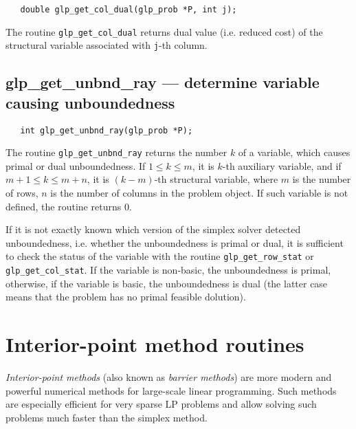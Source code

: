 \synopsis

\begin{verbatim}
   double glp_get_col_dual(glp_prob *P, int j);
\end{verbatim}

\returns

The routine \verb|glp_get_col_dual| returns dual value (i.e. reduced
cost) of the structural variable associated with \verb|j|-th column.

\newpage

\subsection{glp\_get\_unbnd\_ray --- determine variable causing
unboundedness}

\synopsis

\begin{verbatim}
   int glp_get_unbnd_ray(glp_prob *P);
\end{verbatim}

\returns

The routine \verb|glp_get_unbnd_ray| returns the number $k$ of
a variable, which causes primal or dual unboundedness.
If $1\leq k\leq m$, it is $k$-th auxiliary variable, and if
$m+1\leq k\leq m+n$, it is $(k-m)$-th structural variable, where $m$ is
the number of rows, $n$ is the number of columns in the problem object.
If such variable is not defined, the routine returns 0.


If it is not exactly known which version of the simplex solver
detected unboundedness, i.e. whether the unboundedness is primal or
dual, it is sufficient to check the status of the variable
with the routine \verb|glp_get_row_stat| or \verb|glp_get_col_stat|.
If the variable is non-basic, the unboundedness is primal, otherwise,
if the variable is basic, the unboundedness is dual (the latter case
means that the problem has no primal feasible dolution).


\newpage

\section{Interior-point method routines}

{\it Interior-point methods} (also known as {\it barrier methods}) are
more modern and powerful numerical methods for large-scale linear
programming. Such methods are especially efficient for very sparse LP
problems and allow solving such problems much faster than the simplex
method.

